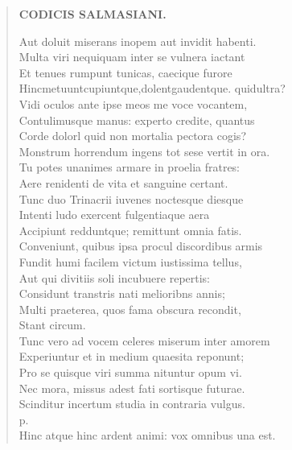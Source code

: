 \documentclass[11pt, a4paper]{report}
\begin{document}
\begin{verse}
    \begin{center} \textbf{CODICIS SALMASIANI.} \end{center} \marginpar{[35]} Aut doluit miserans inopem aut invidit habenti. \\ Multa viri nequiquam inter se vulnera iactant \\ Et tenues rumpunt tunicas, caecique furore \\ Hincmetuuntcupiuntque,dolentgaudentque. \lbrack quidultra? \\ Vidi oculos ante ipse meos me voce vocantem, \\ Contulimusque manus:  \lbrack experto \rbrack  credite, quantus \\ Corde dolorl quid non mortalia pectora cogis? \\ Monstrum horrendum ingens  \lbrack tot \rbrack  sese vertit in ora. \\ Tu potes unanimes armare in proelia fratres: \\ Aere renidenti de vita et sanguine certant. \\ Tunc duo Trinacrii iuvenes noctesque diesque \\ Intenti ludo exercent fulgentiaque aera \\ Accipiunt redduntque; remittunt omnia fatis. \\ Conveniunt, quibus ipsa procul discordibus armis \\ Fundit humi facilem victum iustissima tellus, \\ Aut qui divitiis soli incubuere repertis: \\ Considunt transtris nati melioribns annis; \\ Multi praeterea, quos fama obscura recondit, \\ Stant circum. \\ Tunc vero ad vocem celeres miserum inter amorem \\  \lbrack Experiuntur \rbrack  et in medium quaesita reponunt; \\ Pro se quisque viri summa nituntur opum vi. \\ Nec mora, missus adest fati sortisque futurae. \\ Scinditur incertum studia in contraria vulgus. \\ p. \\ Hinc atque hinc ardent animi: vox omnibus una est. \\ 
      \end{verse}
  
\end{document}
